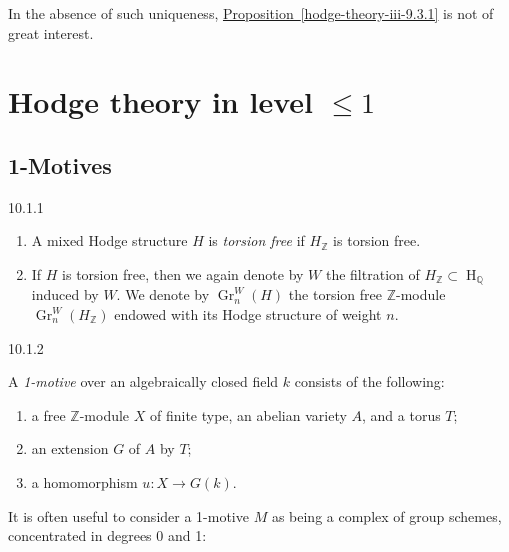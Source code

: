     In the absence of such uniqueness, \hyperref[hodge-theory-iii-9.3.1]{Proposition~\ref*{hodge-theory-iii-9.3.1}} is not of great interest.\chapter{Hodge theory in level \(\leqslant  1\)}\thispagestyle{fancy}\label{hodge-theory-iii-10}\section{1-Motives}\label{hodge-theory-iii-10.1}\begin{definition}{10.1.1}\label{hodge-theory-iii-10.1.1}\skipsinglepar\par{}\begin{enumerate}
      
 \item[(i)]
        A mixed Hodge structure \(H\) is \emph{torsion free} if \(H_\mathbb {Z}\) is torsion free.
      


      
 \item[(ii)]
        If \(H\) is torsion free, then we again denote by \(W\) the filtration of \(H_\mathbb {Z}\subset \operatorname {H}_\mathbb {Q}\) induced by \(W\).
        We denote by \(\operatorname {Gr}_n^W(H)\) the torsion free \(\mathbb {Z}\)-module \(\operatorname {Gr}_n^W(H_\mathbb {Z})\) endowed with its Hodge structure of weight \(n\).
      

    \end{enumerate}\end{definition}\begin{definition}{10.1.2}\label{hodge-theory-iii-10.1.2}\skipsinglepar\par{}A \emph{1-motive} over an algebraically closed field \(k\) consists of the following:

    
 \begin{enumerate}
      
 \item[(a)]
        a free \(\mathbb {Z}\)-module \(X\) of finite type, an abelian variety \(A\), and a torus \(T\);
      

      
 \item[(b)]
        an extension \(G\) of \(A\) by \(T\);
      

      
 \item[(c)]
        a homomorphism \(u\colon  X\to  G(k)\).
      

    \end{enumerate}\end{definition}\par{}It is often useful to consider a 1-motive \(M\) as being a complex of group schemes, concentrated in degrees 0 and 1:
